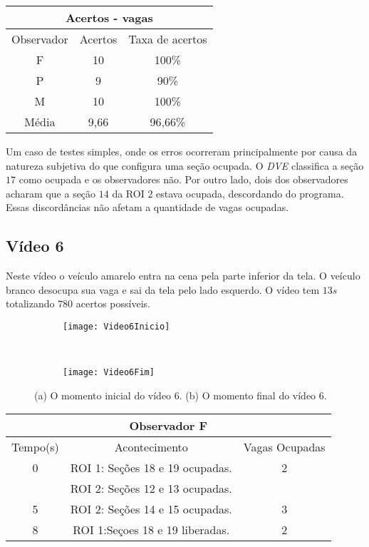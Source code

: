 \begin{center}
\begin{tabular}{|c||c||c|}
\hline
\multicolumn{3}{|c|}{Acertos - vagas}  \\ \hline \hline
Observador & Acertos & Taxa de acertos \\ \hline
F & 10 & 100\% \\  \hline
P & 9 & 90\% \\ \hline
M & 10 & 100\% \\ \hline
Média & 9,66 & 96,66\% \\
\hline
\end{tabular}
\end{center}


Um caso de testes simples, onde os erros ocorreram principalmente por causa da natureza subjetiva do que configura uma seção ocupada. O \textit{DVE} classifica a seção $17$ como ocupada e os observadores não. Por outro lado, dois dos observadores acharam que a seção $14$ da ROI $2$ estava ocupada, descordando do programa. Essas discordâncias não afetam a quantidade de vagas ocupadas.

\subsection{Vídeo 6}

Neste vídeo o veículo amarelo entra na cena pela parte inferior da tela. O veículo branco desocupa sua vaga e sai da tela pelo lado esquerdo. O vídeo tem $13s$ totalizando $780$ acertos possíveis.

\begin{figure}[!h]
\centering
\begin{subfigure}{.5\textwidth}
\centering
\texttt{[image: Video6Inicio]}
\caption{}
\end{subfigure}\
\begin{subfigure}{.5\textwidth}
\centering
\texttt{[image: Video6Fim]}
\caption{}
\end{subfigure}
\centering
\caption{(a) O momento inicial do vídeo 6. (b) O momento final do vídeo 6.}%
\label{}%
\end{figure}

\begin{center}
\begin{tabular}{|c||c||c|}
\hline
\multicolumn{3}{|c|}{Observador F}  \\ \hline \hline
Tempo(s) & Acontecimento & Vagas Ocupadas \\ \hline
0 & ROI 1: Seções 18 e 19 ocupadas. & 2 \\
 & ROI 2: Seções 12 e 13 ocupadas. &  \\ \hline
5 & ROI 2: Seções 14 e 15 ocupadas. & 3 \\ \hline
8 & ROI 1:Seçoes 18 e 19 liberadas. & 2 \\
\hline
\end{tabular}
\end{center}

